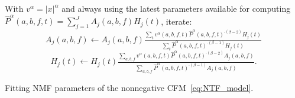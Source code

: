\begin{algorithm}
With $v^{\alpha}=\left|x\right|^{\alpha}$ and always using the latest
parameters available for computing
 $\hat{P}^{\alpha}\left(a,b,f,t\right)=\sum\limits_{j=1}^{J}A_{j}\left(a,b,f\right)H_{j}\left(t\right)$,
iterate:
\[
A_{j}\left(a,b,f\right)\leftarrow A_{j}\left(a,b,f\right)\tfrac{\sum_{t}v^{\alpha}\left(a,b,f,t\right)\hat{P}^{\alpha}\left(a,b,f,t\right)^{\cdot\left(\beta-2\right)}H_{j}\left(t\right)}{\sum_{t}\hat{P}^{\alpha}\left(a,b,f,t\right)^{\cdot\left(\beta-1\right)}H_{j}\left(t\right)}
\]
\[
H_{j}\left(t\right)\leftarrow H_{j}\left(t\right)\tfrac{\sum_{a,b,f}v^{\alpha}\left(a,b,f,t\right)\hat{P}^{\alpha}\left(a,b,f,t\right)^{\cdot\left(\beta-2\right)}A_{j}\left(a,b,f\right)}{\sum_{a,b,f}\hat{P}^{\alpha}\left(a,b,f,t\right)^{\cdot\left(\beta-1\right)}A_{j}\left(a,b,f\right)}.
\]


\caption{Fitting NMF parameters of the nonnegative CFM~\eqref{eq:NTF_model}.\label{alg:Fitting-NTF}}
\end{algorithm}
